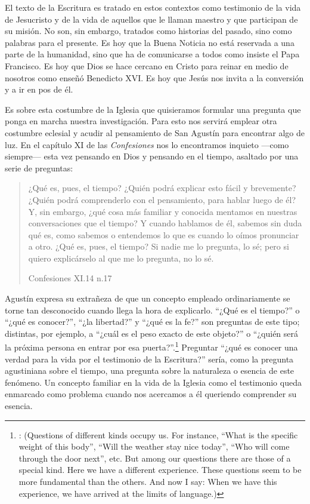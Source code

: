 El texto de la Escritura es tratado en estos contextos como testimonio de la
vida de Jesucristo y de la vida de aquellos que le llaman maestro y que
participan de su misión. No son, sin embargo, tratados como historias del
pasado, sino como palabras para el presente. Es hoy que la Buena Noticia no está
reservada a una parte de la humanidad, sino que ha de comunicarse a todos como
insiste el Papa Francisco. Es hoy que Dios se hace cercano en Cristo para reinar
en medio de nosotros como enseñó Benedicto XVI. Es hoy que Jesús nos invita a la
conversión y a ir en pos de él.

Es sobre esta costumbre de la Iglesia que quisieramos formular una pregunta que
ponga en marcha nuestra investigación. Para esto nos servirá emplear otra
costumbre eclesial y acudir al pensamiento de San Agustín para encontrar algo de
luz. En el capítulo XI de las \emph{Confesiones} nos lo encontramos inquieto
---como siempre--- esta vez pensando en Dios y pensando en el tiempo, asaltado
por una serie de preguntas:

\blockquote[Confesiones XI.14 n.17]{¿Qué es, pues, el tiempo? ¿Quién
  podrá explicar esto fácil y brevemente? ¿Quién podrá comprenderlo con el
  pensamiento, para hablar luego de él? Y, sin embargo, ¿qué cosa más familiar y
  conocida mentamos en nuestras conversaciones que el tiempo? Y cuando hablamos
  de él, sabemos sin duda qué es, como sabemos o entendemos lo que es cuando lo
  oímos pronunciar a otro. ¿Qué es, pues, el tiempo? Si nadie me lo pregunta, lo
  sé; pero si quiero explicárselo al que me lo pregunta, no lo sé.}

Agustín expresa su extrañeza de que un concepto empleado ordinariamente se torne
tan desconocido cuando llega la hora de explicarlo. \enquote{¿Qué es el tiempo?}
o \enquote{¿qué es conocer?}, \enquote{¿la libertad?} y \enquote{¿qué es la fe?}
son preguntas de este tipo; distintas, por ejemplo, a \enquote{¿cuál es el peso
  exacto de este objeto?} o \enquote{¿quién será la próxima persona en entrar
  por esa puerta?}.\footnote{\cite[Cf.~][304]{wittgenstein2005bt}: (Questions of
  different kinds occupy us. For instance, ``What is the specific weight of this
  body'', ``Will the weather stay nice today'', ``Who will come through the door
  next'', etc. But among our questions there are those of a special kind. Here
  we have a different experience. These questions seem to be more fundamental
  than the others. And now I say: When we have this experience, we have arrived
  at the limits of language.)} Preguntar \enquote{¿qué es conocer una verdad
  para la vida por el testimonio de la Escritura?} sería, como la pregunta
agustiniana sobre el tiempo, una pregunta sobre la naturaleza o esencia de este
fenómeno. Un concepto familiar en la vida de la Iglesia como el testimonio queda
enmarcado como problema cuando nos acercamos a él queriendo comprender su
esencia.

